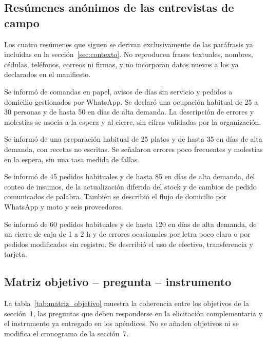 \subsection{Res\'umenes an\'onimos de las entrevistas de campo}

Los cuatro res\'umenes que siguen se derivan exclusivamente de las par\'afrasis ya incluidas en la secci\'on~\ref{sec:contexto}. No reproducen frases textuales, nombres, c\'edulas, tel\'efonos, correos ni firmas, y no incorporan datos nuevos a los ya declarados en el manifiesto.

\begin{description}[leftmargin=18pt,itemsep=4pt]
    \item[\texttt{ENTR-01} -- Administradora.] Se inform\'o de comandas en papel, avisos de d\'ias sin servicio y pedidos a domicilio gestionados por WhatsApp. Se declar\'o una ocupaci\'on habitual de 25 a 30 personas y de hasta 50 en d\'ias de alta demanda. La descripci\'on de errores y molestias se asocia a la espera y al cierre, sin cifras validadas por la organizaci\'on.
    \item[\texttt{ENTR-02} -- Cocinera.] Se inform\'o de una preparaci\'on habitual de 25 platos y de hasta 35 en d\'ias de alta demanda, con recetas no escritas. Se se\~nalaron errores poco frecuentes y molestias en la espera, sin una tasa medida de fallas.
    \item[\texttt{ENTR-03} -- Auxiliar de cocina.] Se inform\'o de 45 pedidos habituales y de hasta 85 en d\'ias de alta demanda, del conteo de insumos, de la actualizaci\'on diferida del stock y de cambios de pedido comunicados de palabra. Tambi\'en se describi\'o el flujo de domicilio por WhatsApp y moto y seis proveedores.
    \item[\texttt{ENTR-04} -- Cajera.] Se inform\'o de 60 pedidos habituales y de hasta 120 en d\'ias de alta demanda, de un cierre de caja de 1 a 2 h y de errores ocasionales por letra poco clara o por pedidos modificados sin registro. Se describi\'o el uso de efectivo, transferencia y tarjeta.
\end{description}

\subsection{Matriz objetivo -- pregunta -- instrumento}

La tabla~\ref{tab:matriz_objetivo} muestra la coherencia entre los objetivos de la secci\'on~1, las preguntas que deben responderse en la elicitaci\'on complementaria y el instrumento ya entregado en los ap\'endices. No se a\~naden objetivos ni se modifica el cronograma de la secci\'on~7.

